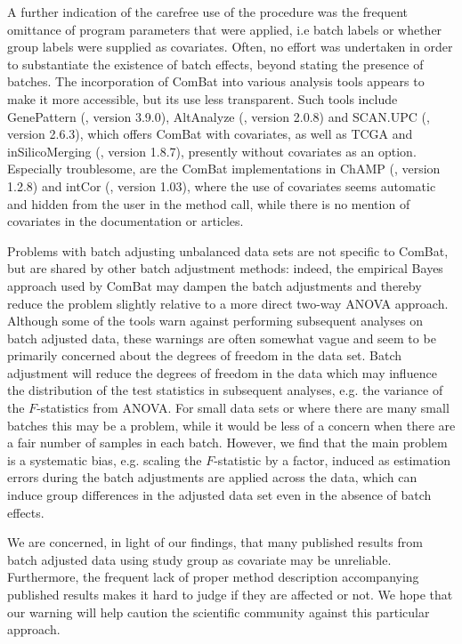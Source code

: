 \documentclass{bio}
\begin{document}
A further indication of the carefree use of the procedure was the frequent omittance of program parameters that were applied, i.e batch labels or whether group labels were supplied as covariates. Often, no effort was undertaken in order to substantiate the existence of batch effects, beyond stating the presence of batches. The incorporation of ComBat into various analysis tools appears to make it more accessible, but its use less transparent. Such tools include GenePattern (\citealp{Reich2006}, version 3.9.0), AltAnalyze (\citealp{Emig2010}, version 2.0.8) and SCAN.UPC (\citealp{Piccolo2013}, version 2.6.3), which offers ComBat with covariates, as well as TCGA and  inSilicoMerging (\citealp{ Taminau2012}, version 1.8.7), presently without covariates as an option. Especially troublesome, are the ComBat implementations in ChAMP (\citealp{Morris2014}, version 1.2.8) and intCor (\citealp{Fernandez-Albert2014}, version 1.03), where the use of covariates seems automatic and hidden from the user in the method call, while there is no mention of covariates in the documentation or articles.

Problems with batch adjusting unbalanced data sets are not specific to ComBat, but are shared by other batch adjustment methods: indeed, the empirical Bayes approach used by ComBat  may dampen the batch adjustments and thereby reduce the problem slightly relative to a more direct two-way ANOVA approach. Although some of the tools warn against performing subsequent analyses on batch adjusted data, these warnings are often somewhat vague and seem to be primarily concerned about the degrees of freedom in the data set. Batch adjustment will reduce the degrees of freedom in the data which may influence the distribution of the test statistics in subsequent analyses, e.g. the variance of the $F$-statistics from ANOVA. For small data sets or where there are many small batches this may be a problem, while it would be less of a concern when there are a fair number of samples in each batch. However, we find that the main problem is a systematic bias, e.g. scaling the $F$-statistic by a factor, induced as estimation errors during the batch adjustments are applied across the data, which can induce group differences in the adjusted data set even in the absence of batch effects.

We are concerned, in light of our findings, that many published results from batch adjusted data using study group as covariate may be unreliable. Furthermore, the frequent lack of proper method description accompanying published results makes it hard to judge if they are affected or not. We hope that our warning will help caution the scientific community against this particular approach.
\end{document}
